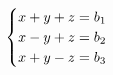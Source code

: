 \documentclass[preview]{standalone}
\begin{document}
\begin{align*}
\special{dvisvgm:raw <g id='unique000'>}\begin{cases}x+y+z=b_1\\x-y+z=b_2\\x+y-z=b_3\end{cases}\special{dvisvgm:raw </g>}
\end{align*}
\end{document}

